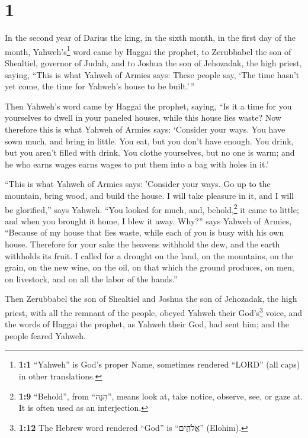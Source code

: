 \hypertarget{section}{%
\section{1}\label{section}}

 In the second year of Darius the king, in the sixth
month, in the first day of the month, Yahweh's\footnote{\textbf{1:1}
  ``Yahweh'' is God's proper Name, sometimes rendered ``LORD'' (all
  caps) in other translations.} word came by Haggai the prophet, to
Zerubbabel the son of Shealtiel, governor of Judah, and to Joshua the
son of Jehozadak, the high priest, saying,  ``This is what
Yahweh of Armies says: These people say, `The time hasn't yet come, the
time for Yahweh's house to be built.'\,''

 Then Yahweh's word came by Haggai the prophet, saying,
 ``Is it a time for you yourselves to dwell in your
paneled houses, while this house lies waste?  Now
therefore this is what Yahweh of Armies says: `Consider your ways.
 You have sown much, and bring in little. You eat, but you
don't have enough. You drink, but you aren't filled with drink. You
clothe yourselves, but no one is warm; and he who earns wages earns
wages to put them into a bag with holes in it.'

 ``This is what Yahweh of Armies says: 'Consider your
ways.  Go up to the mountain, bring wood, and build the
house. I will take pleasure in it, and I will be glorified,'' says
Yahweh.  ``You looked for much, and, behold,\footnote{\textbf{1:9}
  ``Behold'', from ``הִנֵּה'', means look at, take notice, observe, see,
  or gaze at. It is often used as an interjection.} it came to little;
and when you brought it home, I blew it away. Why?'' says Yahweh of
Armies, ``Because of my house that lies waste, while each of you is busy
with his own house.  Therefore for your sake the heavens
withhold the dew, and the earth withholds its fruit.  I
called for a drought on the land, on the mountains, on the grain, on the
new wine, on the oil, on that which the ground produces, on men, on
livestock, and on all the labor of the hands.''

 Then Zerubbabel the son of Shealtiel and Joshua the son
of Jehozadak, the high priest, with all the remnant of the people,
obeyed Yahweh their God's\footnote{\textbf{1:12} The Hebrew word
  rendered ``God'' is ``אֱלֹהִ֑ים'' (Elohim).} voice, and the words of
Haggai the prophet, as Yahweh their God, had sent him; and the people
feared Yahweh.

